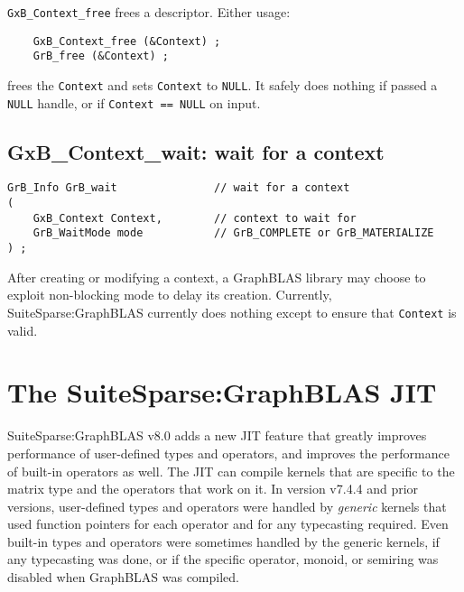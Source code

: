 \documentclass[12pt]{article}
\begin{document}
\verb'GxB_Context_free' frees a descriptor.
Either usage:

    {\small
    \begin{verbatim}
    GxB_Context_free (&Context) ;
    GrB_free (&Context) ; \end{verbatim}}

\noindent
frees the \verb'Context' and sets \verb'Context' to \verb'NULL'.  It
safely does nothing if passed a \verb'NULL' handle, or if
\verb'Context == NULL' on input.

\subsection{{\sf GxB\_Context\_wait:} wait for a context}
\label{context_wait}

\begin{mdframed}[userdefinedwidth=6in]
{\footnotesize
\begin{verbatim}
GrB_Info GrB_wait               // wait for a context
(
    GxB_Context Context,        // context to wait for
    GrB_WaitMode mode           // GrB_COMPLETE or GrB_MATERIALIZE
) ;
\end{verbatim}
}\end{mdframed}

After creating or modifying a context, a GraphBLAS library may choose to
exploit non-blocking mode to delay its creation.  Currently,
SuiteSparse:GraphBLAS currently does nothing except to ensure that
\verb'Context' is valid.

\newpage
\section{The SuiteSparse:GraphBLAS JIT} %
\label{jit}

SuiteSparse:GraphBLAS v8.0 adds a new JIT feature that greatly improves
performance of user-defined types and operators, and improves the performance
of built-in operators as well.  The JIT can compile kernels that are specific
to the matrix type and the operators that work on it.  In version v7.4.4 and
prior versions, user-defined types and operators were handled by {\em generic}
kernels that used function pointers for each operator and for any typecasting
required.  Even built-in types and operators were sometimes handled by the
generic kernels, if any typecasting was done, or if the specific operator,
monoid, or semiring was disabled when GraphBLAS was compiled.
\end{document}
